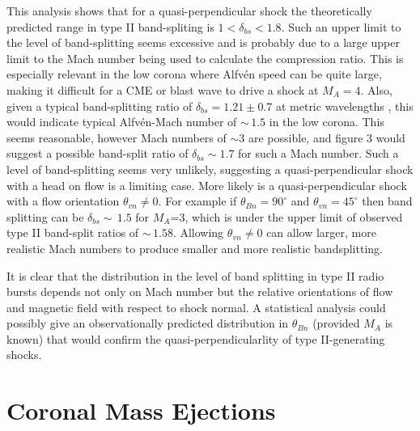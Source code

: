 This analysis shows that for a quasi-perpendicular shock the theoretically predicted range in type II band-spliting is $1<\delta_{bs}<1.8$. Such an upper limit to the level of band-splitting seems excessive and is probably due to a large upper limit to the Mach number being used to calculate the compression ratio. This is especially relevant in the low corona where Alfv\'{e}n speed can be quite large, making it difficult for a CME or blast wave to drive a shock at $M_A=4$. Also, given a typical band-splitting ratio of $\delta_{bs}=1.21\pm0.7$ at metric wavelengths \citep{vrsnak2004}, this would indicate typical Alfv\'{e}n-Mach number of $\sim\,1.5$ in the low corona. This seems reasonable, however Mach numbers of $\sim$3 are possible, and figure 3 would suggest a possible band-split ratio of $\delta_{bs}\sim1.7$ for such a Mach number. Such a level of band-splitting seems very unlikely, suggesting a quasi-perpendicular shock with a head on flow is a limiting case. More likely is a quasi-perpendicular shock with a flow orientation $\theta_{vn}\neq0$. For example if $\theta_{Bn}=90^{\circ}$ and $\theta_{vn}=45^{\circ}$ then band splitting can be $\delta_{bs}\sim\,1.5$ for $M_A$=3, which is under the upper limit of observed type II band-split ratios of $\sim\,1.58$. Allowing $\theta_{vn}\neq0$ can allow larger, more realistic Mach numbers to produce smaller and more realistic bandsplitting.


It is clear that the distribution in the level of band splitting in type II radio bursts depends not only on Mach number but the relative orientations of flow and magnetic field with respect to shock normal. A statistical analysis could possibly give an observationally predicted distribution in $\theta_{Bn}$ (provided $M_A$ is known) that would confirm the quasi-perpendicularlity of type II-generating shocks.




\section{Coronal Mass Ejections}\label{sec:2}

